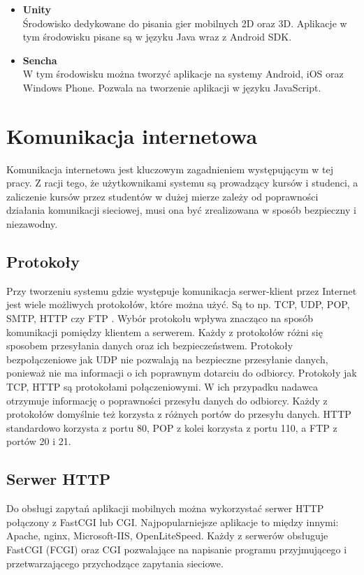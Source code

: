 \documentclass[eng]{mgr}
\begin{document}
\begin{itemize}
				\item \textbf{Unity}\\
				Środowisko dedykowane do pisania gier mobilnych 2D oraz 3D. Aplikacje w tym środowisku pisane są w języku Java wraz z Android SDK.
				
				\item \textbf{Sencha}\\
				W tym środowisku można tworzyć aplikacje na systemy Android, iOS oraz Windows Phone. Pozwala na tworzenie aplikacji w języku JavaScript.
				
			\end{itemize}
	
		\section{Komunikacja internetowa}
		Komunikacja internetowa jest kluczowym zagadnieniem występującym w tej pracy. Z racji tego, że użytkownikami systemu są prowadzący kursów i studenci, a zaliczenie kursów przez studentów w dużej mierze zależy od poprawności działania komunikacji sieciowej, musi ona być zrealizowana w sposób bezpieczny i niezawodny.
		
			\subsection{Protokoły}
			Przy tworzeniu systemu gdzie występuje komunikacja serwer-klient przez Internet jest wiele możliwych protokołów, które można użyć. Są to np. TCP, UDP, POP, SMTP, HTTP czy FTP \cite{protocols}. Wybór protokołu wpływa znacząco na sposób komunikacji pomiędzy klientem a serwerem. Każdy z protokołów różni się sposobem przesyłania danych oraz ich bezpieczeństwem. Protokoły bezpołączeniowe jak UDP nie pozwalają na bezpieczne przesyłanie danych, ponieważ nie ma informacji o ich poprawnym dotarciu do odbiorcy. Protokoły jak TCP, HTTP są protokołami połączeniowymi. W ich przypadku nadawca otrzymuje informację o poprawności przesyłu danych do odbiorcy. Każdy z protokołów domyślnie też korzysta z różnych portów do przesyłu danych. HTTP standardowo korzysta z portu 80, POP z kolei korzysta z portu 110, a FTP z portów 20 i 21.
	
			\subsection{Serwer HTTP}
			Do obsługi zapytań aplikacji mobilnych można wykorzystać serwer HTTP połączony z FastCGI \cite{fcgi} lub CGI. Najpopularniejsze aplikacje \cite{httpserversusage} to między innymi: Apache, nginx, Microsoft-IIS, OpenLiteSpeed. Każdy z serwerów obsługuje FastCGI (FCGI) oraz CGI pozwalające na napisanie programu przyjmującego i przetwarzającego przychodzące zapytania sieciowe.\\
			
\end{document}
